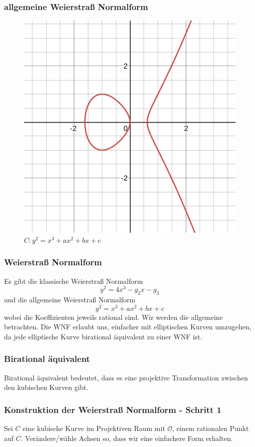 \documentclass{beamer}
\begin{document}
\begin{frame}
\frametitle{allgemeine Weierstraß Normalform}
    \begin{figure}
		\caption{$C: y^2=x^3+ax^2+bx+c$}
		\includegraphics[scale=0.3]{images/desmos-graph02.png}
    \end{figure}
\end{frame}

\begin{frame}
\frametitle{Weierstraß Normalform}
	Es gibt die klassische Weierstraß Normalform
	\[y^2=4x^3-g_2x-g_3\]
	und die allgemeine Weierstraß Normalform
	\[y^2=x^3+ax^2+bx+c\]
	wobei die Koeffizienten jeweils rational sind. Wir werden die
	allgemeine betrachten. Die WNF erlaubt uns, einfacher mit
	elliptischen Kurven umzugehen, da jede elliptische Kurve
	birational äquivalent zu einer WNF ist.\\
\end{frame}

\begin{frame}
\frametitle{Birational äquivalent}
	Birational äquivalent bedeutet, dass es eine projektive
	Transformation zwischen den kubischen Kurven gibt.
\end{frame}

\begin{frame}
\frametitle{Konstruktion der Weierstraß Normalform - Schritt 1}
	Sei \(C\) eine kubische Kurve im Projektiven Raum
	mit \(\mathcal{O}\), einem rationalen Punkt auf \(C\).
	Verändere/wähle Achsen so, dass wir eine einfachere Form
	erhalten.
\end{frame}
\end{document}
